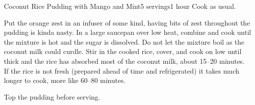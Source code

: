 \documentclass[../Cookbook.tex]{subfiles}
\begin{document}
\begin{recipe}[CoconutRicePudding]{Coconut Rice Pudding with Mango and Mint}{5 servings}{1 hour}
	Cook as usual.

	Put the orange zest in an infuser of some kind, having bits of zest throughout the pudding is kinda nasty.
	In a large saucepan over low heat, combine and cook until the mixture is hot and the sugar is dissolved. Do not let the mixture boil as the coconut milk could curdle.
	Stir in the cooked rice, cover, and cook on low until thick and the rice has absorbed most of the coconut milk, about 15--20 minutes.
	If the rice is not fresh (prepared ahead of time and refrigerated) it takes much longer to cook, more like 60--80 minutes.

	Top the pudding before serving.
\end{recipe}
\end{document}
